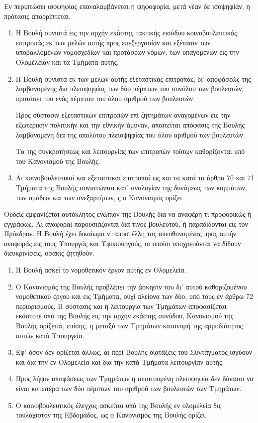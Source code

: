 \documentclass[twoside, a4paper, 10pt]{article}
\begin{document}
\begin{multicols}{2}
\begin{enumerate}
\begin{BigQuote}
	Εν περιπτώσει ισοψηφίας επαναλαμβάνεται η ψηφοφορία, μετά νέαν δε ισοψηφίαν, η πρότασις απορρίπτεται.

\begin{enumerate}
  \item[1.] Η Βουλή συνιστά εις την αρχήν εκάστης τακτικής εισόδου κοινοβουλευτικάς επιτροπάς εκ των μελών αυτής προς επεξεργασίαν και εξέτασιν των υποβαλλομένων νομοσχεδίων και προτάσεων νόμων, των υπαγομένων εις την Ολομέλειαν και τα Τμήματα αυτής.
  \item[2.] Η Βουλή συνιστά εκ των μελών αυτής εξεταστικάς επιτροπάς, δι' αποφάσεώς της λαμβανομένης δια πλειοψηφίας των δύο πέμπτων του συνόλου των βουλευτών, προτάσει του ενός πέμπτου του όλου αριθμού των βουλευτών.

	Προς σύστασιν εξεταστικών επιτροπών επί ζητημάτων αναγομένων εις την εξωτερικήν πολιτικήν και την εθνικήν άμυναν, απαιτείται απόφασις της Βουλής λαμβανομένη δια της απολύτου πλειοψηφίας του όλου αριθμού των βουλευτών.

Τα της συγκροτήσεως και λειτουργίας των επιτροπών τούτων καθορίζονται υπό του Κανονισμού της Βουλής.
  \item[3.] Αι κοινοβουλευτικαί και εξεταστικαί επιτροπαί ως και τα κατά τα άρθρα 70 και 71 Τμήματα της Βουλής συνιστώνται κατ' αναλογίαν της δυνάμεως των κομμάτων, των ομάδων και των ανεξαρτήτων, ς ο Κανονισμός ορίζει.
\end{enumerate}

Ουδείς εμφανίζεται αυτόκλητος ενώπιον της Βουλής δια να αναφέρη  τι προφορικώς ή εγγράφως. Αι αναφοραί παρουσιάζονται δια τινος βουλευτού, ή παραδίδονται εις τον Πρόεδρον. Η Βουλή έχει  δικαίωμα ν' αποστέλλη τας απευθυνομένας προς αυτήν αναφοράς εις τους Υπουργός και Υφυπουργούς, οι οποίοι υποχρεούνται να δίδουν διευκρινίσεις, οσάκις ζητηθούν.

\begin{enumerate}
  \item[1.] Η Βουλή ασκεί το νομοθετικόν έργον αυτής εν Ολομελεία.
  \item[2.] Ο Κανονισμός της Βουλής προβλέπει την άσκησιν του δι' αυτού καθοριζομένου νομοθετικού έργου και εις Τμήματα, ουχί πλείονα των δύο, υπό τους εν άρθρω 72 περιορισμούς. Η σύστασις και η λειτουργία των Τμημάτων αποφασίζεται εκάστοτε υπό της Βουλής εις την αρχήν εκάστης συνόδου, Κανονισμού της Βουλής ορίζεται, επίσης, η μεταξύ των Τμημάτων κατανομή της αρμοδιότητος αυτών κατά Υπουργεία.
  \item[3.] Εφ' όσον δεν ορίζεται άλλως, αι περί Βουλής διατάξεις του Συντάγματος ισχύουν και δια την εν Ολομελεία και δια την κατά Τμήματα λειτουργίαν αυτής.
  \item[4.] Προς λήψιν αποφάσεως των Τμημάτων η απαιτουμένη πλειοψηφία  δεν δύναται να είναι κατωτέρα των δύο πέμπτων του αριθμού των βουλευτών των Τμημάτων.
  \item[5.] Ο κοινοβουλευτικός έλεγχος ασκείται υπό της Βουλής εν ολομελεία δις τουλάχιστον της Εβδομάδος, ως ο Κανονισμός της Βουλής ορίζει.
\end{enumerate}


\end{BigQuote}
\end{enumerate}
\end{multicols}
\end{document}
